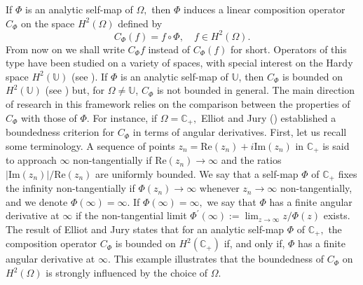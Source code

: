\documentclass[11pt]{amsart}%
\theoremstyle{definition}
\theoremstyle{remark}
\numberwithin{equation}{section}
\begin{document}
If $\Phi$ is an analytic self-map of $\Omega,$ then $\Phi$ induces a linear
composition operator $C_{\Phi}$ on the space $H^{2}(\Omega)$ defined
by
\[
C_{\Phi}(f)=f\circ\Phi,\quad f\in H^{2}(\Omega).
\]
From now on we shall write $C_{\Phi}f$ instead of $C_{\Phi}(f)$ for short.
Operators of this type have been studied on a variety of spaces, with special
interest on the Hardy space $H^{2}(\mathbb{U})$ (see
\cite{Cowen-MacClauer,Elliot-Jury,Avendano-Rosenthal,Joel
Shapiro,Shapiro-Smith}). If $\Phi$ is an analytic self-map of $\mathbb{U}$,
then $C_{\Phi}$ is bounded on $H^{2}(\mathbb{U})$ (see \cite[Littlewood's
Theorem, p. 16]{Joel Shapiro}) but, for $\Omega\neq\mathbb{U}$, $C_{\Phi}$ is
not bounded in general. The main direction of research in this framework
relies on the comparison between the properties of $C_{\Phi}$ with those of
$\Phi.$ For instance, if $\Omega=\mathbb{C}_{+},$ Elliot and Jury
(\cite[Theorem 3.1]{Elliot-Jury}) established a boundedness criterion for
$C_{\Phi}$ in terms of angular derivatives. First, let us recall some
terminology. A sequence of points $z_{n}=\mathrm{Re}(z_{n})+i\mathrm{Im}%
(z_{n})$ in $\mathbb{C}_{+}$ is said to approach $\infty$ non-tangentially if
$\mathrm{Re}(z_{n})\longrightarrow\infty$ and the ratios $|\mathrm{Im}%
(z_{n})|/\mathrm{Re}(z_{n})$ are uniformly bounded. We say that a self-map
$\Phi$ of $\mathbb{C}_{+}$ fixes the infinity non-tangentially if $\Phi
(z_{n})\longrightarrow\infty$ whenever $z_{n}\longrightarrow\infty$
non-tangentially, and we denote $\Phi(\infty)=\infty.$ If $\Phi(\infty
)=\infty,$ we say that $\Phi$ has a finite angular derivative at $\infty$ if
the non-tangential limit $\Phi^{\prime}(\infty):=\displaystyle\lim
_{z\longrightarrow\infty}z/\Phi(z)$ exists. The result of Elliot and Jury
states that for an analytic self-map $\Phi$ of $\mathbb{C}_{+},$ the
composition operator $C_{\Phi}$ is bounded on $H^{2}(\mathbb{C}_{+})$ if, and
only if, $\Phi$ has a finite angular derivative at $\infty$. This example
illustrates that the boundedness of $C_{\Phi}$ on $H^{2}(\Omega)$ is strongly
influenced by the choice of $\Omega$.
\end{document}
